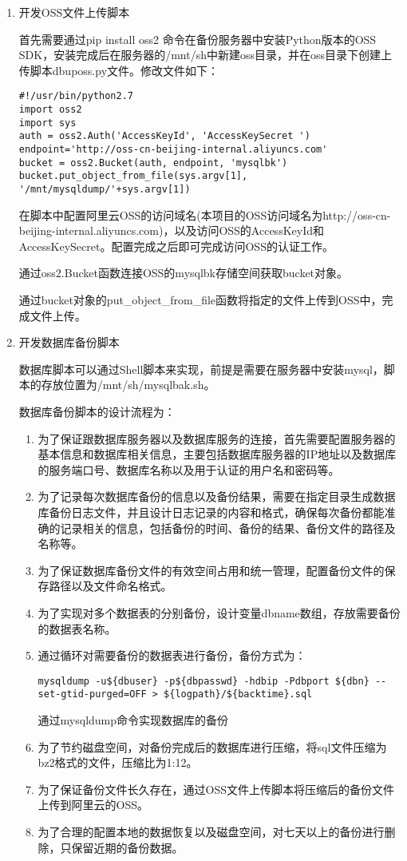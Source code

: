 \begin{enumerate}
\item 开发OSS文件上传脚本

首先需要通过pip install oss2 命令在备份服务器中安装Python版本的OSS SDK，安装完成后在服务器的/mnt/sh中新建oss目录，并在oss目录下创建上传脚本dbuposs.py文件。修改文件如下：
\begin{lstlisting}[numbers=none]
#!/usr/bin/python2.7
import oss2
import sys
auth = oss2.Auth('AccessKeyId', 'AccessKeySecret ')
endpoint='http://oss-cn-beijing-internal.aliyuncs.com'
bucket = oss2.Bucket(auth, endpoint, 'mysqlbk')
bucket.put_object_from_file(sys.argv[1], '/mnt/mysqldump/'+sys.argv[1])
\end{lstlisting}
在脚本中配置阿里云OSS的访问域名(本项目的OSS访问域名为http://oss-cn-beijing-internal.aliyuncs.com)，以及访问OSS的AccessKeyId和AccessKeySecret。配置完成之后即可完成访问OSS的认证工作。

通过oss2.Bucket函数连接OSS的mysqlbk存储空间获取bucket对象。

通过bucket对象的put\_object\_from\_file函数将指定的文件上传到OSS中，完成文件上传。
\item 开发数据库备份脚本

数据库脚本可以通过Shell脚本来实现，前提是需要在服务器中安装mysql，脚本的存放位置为/mnt/sh/mysqlbak.sh。

数据库备份脚本的设计流程为：
\begin{enumerate}
  \item 为了保证跟数据库服务器以及数据库服务的连接，首先需要配置服务器的基本信息和数据库相关信息，主要包括数据库服务器的IP地址以及数据库的服务端口号、数据库名称以及用于认证的用户名和密码等。
  \item 为了记录每次数据库备份的信息以及备份结果，需要在指定目录生成数据库备份日志文件，并且设计日志记录的内容和格式，确保每次备份都能准确的记录相关的信息，包括备份的时间、备份的结果、备份文件的路径及名称等。
  \item 为了保证数据库备份文件的有效空间占用和统一管理，配置备份文件的保存路径以及文件命名格式。
  \item 为了实现对多个数据表的分别备份，设计变量dbname数组，存放需要备份的数据表名称。
  \item 通过循环对需要备份的数据表进行备份，备份方式为：
  \begin{lstlisting}[numbers=none]
  mysqldump -u${dbuser} -p${dbpasswd} -hdbip -Pdbport ${dbn} --set-gtid-purged=OFF > ${logpath}/${backtime}.sql
  \end{lstlisting}
  通过mysqldump命令实现数据库的备份
  \item 为了节约磁盘空间，对备份完成后的数据库进行压缩，将sql文件压缩为bz2格式的文件，压缩比为1:12。
  \item 为了保证备份文件长久存在，通过OSS文件上传脚本将压缩后的备份文件上传到阿里云的OSS。
  \item 为了合理的配置本地的数据恢复以及磁盘空间，对七天以上的备份进行删除，只保留近期的备份数据。
\end{enumerate}


\end{enumerate}
